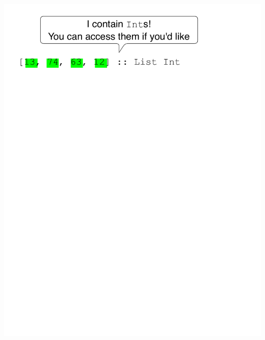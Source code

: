 \documentclass[UKenglish,usenames,dvipsnames,svgnames,table,aspectratio=169,mathserif]{beamer}
\begin{document}
\begin{frame}
\includegraphics[scale=0.7]{contravariant-want-as1.pdf}
\end{frame}
\end{document}

